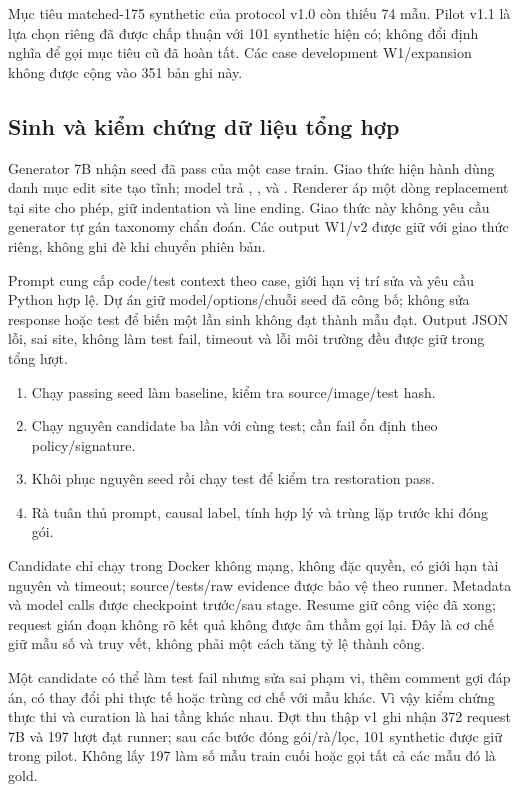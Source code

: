 \documentclass[12pt,a4paper]{article}
\begin{document}
Mục tiêu matched-175 synthetic của protocol v1.0 còn thiếu 74 mẫu. Pilot v1.1 là lựa chọn riêng đã được chấp thuận với 101 synthetic hiện có; không đổi định nghĩa để gọi mục tiêu cũ đã hoàn tất. Các case development W1/expansion không được cộng vào 351 bản ghi này.

\nextpage
\subsection{Sinh và kiểm chứng dữ liệu tổng hợp}
Generator 7B nhận seed đã pass của một case train. Giao thức hiện hành  dùng danh mục edit site tạo tĩnh; model trả , ,  và . Renderer áp một dòng replacement tại site cho phép, giữ indentation và line ending. Giao thức này không yêu cầu generator tự gán taxonomy chẩn đoán. Các output W1/v2 được giữ với giao thức riêng, không ghi đè khi chuyển phiên bản.

Prompt cung cấp code/test context theo case, giới hạn vị trí sửa và yêu cầu Python hợp lệ. Dự án giữ model/options/chuỗi seed đã công bố; không sửa response hoặc test để biến một lần sinh không đạt thành mẫu đạt. Output JSON lỗi, sai site, không làm test fail, timeout và lỗi môi trường đều được giữ trong tổng lượt.

\begin{enumerate}
\item Chạy passing seed làm baseline, kiểm tra source/image/test hash.
\item Chạy nguyên candidate ba lần với cùng test; cần fail ổn định theo policy/signature.
\item Khôi phục nguyên seed rồi chạy test để kiểm tra restoration pass.
\item Rà tuân thủ prompt, causal label, tính hợp lý và trùng lặp trước khi đóng gói.
\end{enumerate}

Candidate chỉ chạy trong Docker không mạng, không đặc quyền, có giới hạn tài nguyên và timeout; source/tests/raw evidence được bảo vệ theo runner. Metadata và model calls được checkpoint trước/sau stage. Resume giữ công việc đã xong; request gián đoạn không rõ kết quả không được âm thầm gọi lại. Đây là cơ chế giữ mẫu số và truy vết, không phải một cách tăng tỷ lệ thành công.

Một candidate có thể làm test fail nhưng sửa sai phạm vi, thêm comment gợi đáp án, có thay đổi phi thực tế hoặc trùng cơ chế với mẫu khác. Vì vậy kiểm chứng thực thi và curation là hai tầng khác nhau. Đợt thu thập v1 ghi nhận 372 request 7B và 197 lượt đạt runner; sau các bước đóng gói/rà/lọc, 101 synthetic được giữ trong pilot. Không lấy 197 làm số mẫu train cuối hoặc gọi tất cả các mẫu đó là gold.
\end{document}
